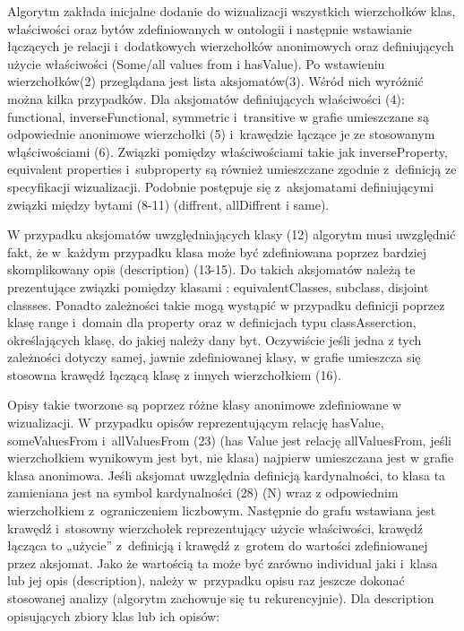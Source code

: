 Algorytm zakłada inicjalne dodanie do wizualizacji wszystkich wierzchołków klas, właściwości oraz bytów zdefiniowanych w ontologii i następnie wstawianie łączących
 je relacji i~dodatkowych wierzchołków anonimowych oraz definiujących użycie właściwości (Some/all values from i hasValue). Po wstawieniu wierzchołków(2) przeglądana
 jest lista aksjomatów(3). Wśród nich wyróżnić można kilka przypadków. Dla  aksjomatów definiujących właściwości (4): functional, inverseFunctional, symmetric 
i~transitive w grafie umieszczane są odpowiednie anonimowe wierzchołki (5) i~krawędzie łączące je ze stosowanym włąściwościami (6). Związki pomiędzy właściwościami takie jak 
inverseProperty, equivalent properties i~subproperty są również umieszczane zgodnie z~definicją ze specyfikacji wizualizacji. Podobnie postępuje się z~aksjomatami 
definiującymi związki między bytami (8-11) (diffrent, allDiffrent i same).
\par
W przypadku aksjomatów uwzględniających klasy (12) algorytm musi uwzględnić fakt, że w~każdym przypadku klasa może być zdefiniowana poprzez bardziej skomplikowany
 opis (description) (13-15). Do takich aksjomatów należą te prezentujące związki pomiędzy klasami : equivalentClasses, subclass,  disjoint classses.
  Ponadto zależności takie mogą wystąpić w przypadku definicji poprzez klasę range i~domain dla property oraz w definicjach typu classAsserction, określających 
klasę, do jakiej należy dany byt. Oczywiście jeśli jedna z tych zależności dotyczy samej, jawnie zdefiniowanej klasy, w grafie umieszcza się stosowna 
krawędź łączącą klasę z innych wierzchołkiem (16). 
\par
Opisy takie tworzone są poprzez różne klasy anonimowe  zdefiniowane w wizualizacji. W przypadku opisów reprezentującym relację hasValue, someValuesFrom 
i~allValuesFrom (23) (has Value jest relację allValuesFrom, jeśli  wierzchołkiem wynikowym jest byt, nie klasa)  najpierw umieszczana jest w grafie klasa anonimowa.
 Jeśli aksjomat uwzględnia definicją kardynalności, to klasa ta zamieniana jest na symbol kardynalności (28) (N) wraz z odpowiednim wierzchołkiem 
z~ograniczeniem liczbowym. Następnie do grafu wstawiana jest krawędź i~stosowny wierzchołek reprezentujący użycie właściwości, krawędź łącząca to „użycie” 
z~definicją i krawędź z~grotem do wartości zdefiniowanej przez aksjomat. Jako że wartością ta może być zarówno individual jaki i~klasa lub jej opis (description),
 należy w~przypadku opisu raz jeszcze dokonać stosowanej analizy (algorytm zachowuje się tu rekurencyjnie). Dla description opisujących zbiory klas lub ich opisów:
